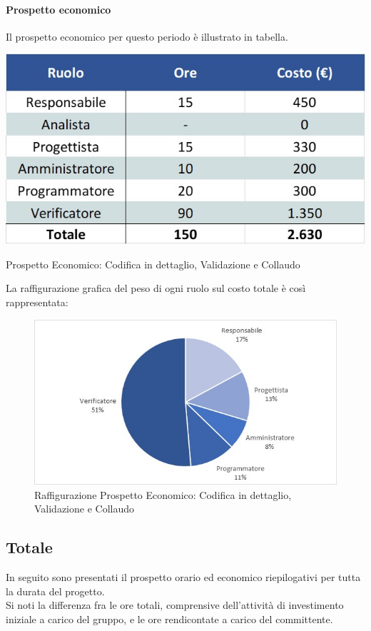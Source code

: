 \paragraph{Prospetto economico}
Il prospetto economico per questo periodo è illustrato in tabella. 
\begin{table}[H]
	\centerline{\includegraphics[scale=0.7]{img/Preventivo/CodDettaglioValidazioneCollaudoEconomico.jpg}}
	\caption{Prospetto Economico: Codifica in dettaglio, Validazione e Collaudo}
	\clearpage
\end{table}
La raffigurazione grafica del peso di ogni ruolo sul costo totale è così rappresentata: 
\begin{figure}[H]
	\centerline{\includegraphics[scale=0.9]{img/Preventivo/Torte/CodDettaglioValidazioneCollaudo.jpg}}
	\caption{Raffigurazione Prospetto Economico: Codifica in dettaglio, Validazione e Collaudo}
	\clearpage
\end{figure} 
\newpage
\subsection{Totale}
In seguito sono presentati il prospetto orario ed economico riepilogativi per tutta la durata del progetto.\\
Si noti la differenza fra le ore totali, comprensive dell'attività di investimento iniziale a carico del gruppo, e le ore rendicontate a carico del committente.
